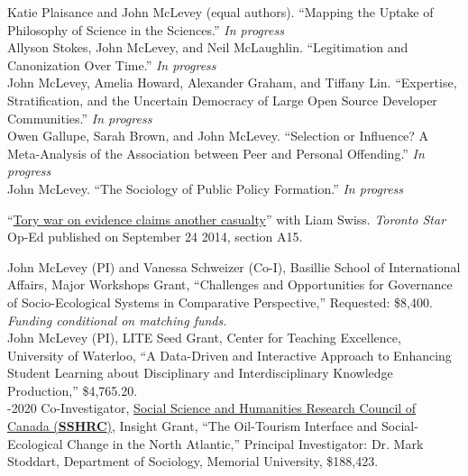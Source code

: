 \documentclass[9pt,usenames,dvipsnames]{article}
\begin{document}
\ind Katie Plaisance and John McLevey (equal authors). ``Mapping the Uptake of Philosophy of Science in the Sciences.'' \emph{In progress}\\

\ind Allyson Stokes, John McLevey, and Neil McLaughlin. ``Legitimation and Canonization Over Time.'' \emph{In progress}\\

\ind John McLevey, Amelia Howard, Alexander Graham, and Tiffany Lin. ``Expertise, Stratification, and the Uncertain Democracy of Large Open Source Developer Communities.'' \emph{In progress}\\

\ind Owen Gallupe, Sarah Brown, and John McLevey. ``Selection or Influence? A Meta-Analysis of the Association between Peer and Personal Offending.'' \emph{In progress} \\

\ind John McLevey. ``The Sociology of Public Policy Formation.'' \emph{In progress} \\


\ind ``\href{http://bit.ly/1ohSn1N}{Tory war on evidence claims another casualty}'' with Liam Swiss. \emph{Toronto Star} Op-Ed published on September 24 2014, section A15. \\


\ind John McLevey (PI) and Vanessa Schweizer (Co-I), Basillie School of International Affairs, Major Workshops Grant, ``Challenges and Opportunities for Governance of Socio-Ecological Systems in Comparative Perspective,'' Requested: \$8,400. \emph{Funding conditional on matching funds.} \\

\ind John McLevey (PI), LITE Seed Grant, Center for Teaching Excellence, University of Waterloo, ``A Data-Driven and Interactive Approach to Enhancing Student Learning about Disciplinary and Interdisciplinary Knowledge Production,'' \$4,765.20. \\

-2020 Co-Investigator, \href{http://www.sshrc-crsh.gc.ca/funding-financement/programs-programmes/insight_development_grants-su
bventions_de_developpement_savoir-eng.aspx}{Social Science and Humanities Research Council of Canada (\textbf{SSHRC})}, Insight Grant, ``The Oil-Tourism Interface and Social-Ecological Change in the North Atlantic,'' Principal Investigator: Dr. Mark Stoddart, Department of Sociology, Memorial University, \$188,423. \\
\end{document}
